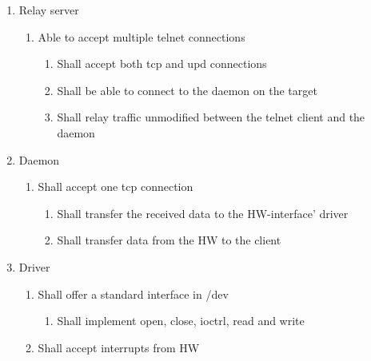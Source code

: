 \documentclass[12pt,a4paper]{report}
\begin{document}
\begin{enumerate}
\begin{enumerate}
	
	\item Relay server
	\begin{enumerate}
		\item Able to accept multiple telnet connections
		\begin{enumerate}
			\item Shall accept both tcp and upd connections
			\item Shall be able to connect to the daemon on the target
			\item Shall relay traffic unmodified between the telnet client and the daemon
		\end{enumerate}
	\end{enumerate}
	
	
	\item Daemon
	\begin{enumerate}
	\item Shall accept one tcp connection
		\begin{enumerate}
			\item Shall transfer the received data to the HW-interface' driver
			\item Shall transfer data from the HW to the client
		\end{enumerate}
	\end{enumerate}
	
	
	
	\item Driver
	\begin{enumerate}
		\item Shall offer a standard interface in /dev
		\begin{enumerate}
			\item Shall implement open, close, ioctrl, read and write
		\end{enumerate}
		\item Shall accept interrupts from HW
	\end{enumerate}
	
	
	
\end{enumerate}
\end{enumerate}
\end{document}
